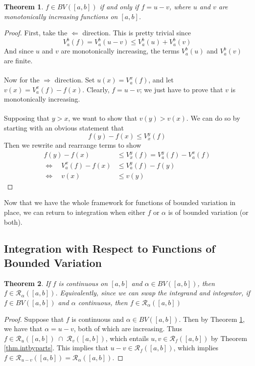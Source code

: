 \documentclass[12pt]{article}
\theoremstyle{plain}
\newtheorem{thm}{Theorem}[subsection]
\theoremstyle{definition}
\theoremstyle{remark}
\begin{document}
\begin{thm}
\label{monot}
$f\in BV([a,b])$ if and only if $f = u-v$, where $u$ and $v$ are monotonically increasing functions on $[a,b]$. 
\end{thm}
\begin{proof}
First, take the $\Leftarrow$ direction. This is pretty trivial since 
    \[ V_a^b(f) = V_a^b(u-v) \leq V_a^b(u) + V_a^b(v) \]
And since $u$ and $v$ are monotonically increasing, the terms $V_a^b(u)$ and $V_a^b(v)$ are finite.
\\
\\
Now for the $\Rightarrow$ direction. Set $u(x) = V_a^x(f)$, and let $v(x)=V_a^x(f) - f(x)$. Clearly, $f = u-v$; we just have to prove that $v$ is monotonically increasing.
\\
\\
Supposing that $y>x$, we want to show that $v(y) > v(x)$. We can do so by starting with an obvious statement that 
    \[ f(y) - f(x) \leq V_x^y(f) \]
Then we rewrite and rearrange terms to show
\begin{align*}
    f(y) - f(x) &\leq V_x^y(f) = V_a^y(f) - V_a^x(f)  \\
    \Leftrightarrow\quad V_a^x(f) - f(x) &\leq V_a^y(f) - f(y)  \\
    \Leftrightarrow\quad v(x) &\leq v(y)  
\end{align*}
\end{proof}

Now that we have the whole framework for functions of bounded variation in place, we can return to integration when either $f$ or $\alpha$ is of bounded variation (or both). 

\subsection{Integration with Respect to Functions of Bounded Variation}

\begin{thm}
If $f$ is continuous on $[a,b]$ and $\alpha\in BV([a,b])$, then $f\in\mathscr{R}_\alpha([a,b])$. Equivalently, since we can swap the integrand and integrator, if $f\in BV([a,b])$ and $\alpha$ continuous, then $f\in\mathscr{R}_\alpha([a,b])$
\end{thm}
\begin{proof}
Suppose that $f$ is continuous and $\alpha\in BV([a,b])$. Then by Theorem \ref{monot}, we have that $\alpha = u -v$, both of which are increasing. Thus $f\in\mathscr{R}_u([a,b]) \;\cap \;\mathscr{R}_v([a,b])$, which entails $u, v \in \mathscr{R}_f([a,b])$ by Theorem \ref{thm.intbyparts}.  This implies that $u-v\in\mathscr{R}_f([a,b])$, which implies $f\in\mathscr{R}_{u-v}([a,b]) = \mathscr{R}_\alpha([a,b])$.
\end{proof}
\end{document}

